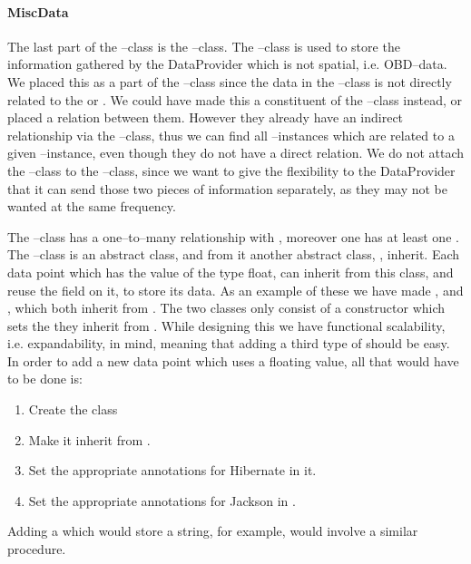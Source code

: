 \paragraph*{MiscData}
The last part of the --class is the --class. 
The --class is used to store the information gathered by the DataProvider which is not spatial, i.e. \ac{OBD}--data.
We placed this as a part of the --class since the data in the --class is not directly related to the  or . 
We could have made this a constituent of the --class instead, or placed a relation between them.
However they already have an indirect relationship via the --class, 
thus we can find all --instances which are related to a given --instance, even though they do not have a direct relation. 
We do not attach the --class to the --class, 
since we want to give the flexibility to the DataProvider that it can send those two pieces of information separately, as they may not be wanted at the same frequency. 

The --class has a one--to--many relationship with , moreover one  has at least one . 
The --class is an abstract class, and from it another abstract class, , inherit. 
Each data point which has the value of the type float, can inherit from this class, and reuse the  field on it, to store its data.
As an example of these we have made , and , which both inherit from . 
The two classes only consist of a constructor which sets the  they inherit from .
While designing this we have functional scalability, i.e. expandability, in mind, meaning that adding a third type of  should be easy. 
In order to add a new data point which uses a floating value, all that would have to be done is: 
\begin{enumerate}
    \item Create the class 
    \item Make it inherit from .
    \item Set the appropriate annotations for Hibernate in it.
    \item Set the appropriate annotations for Jackson in .
\end{enumerate}

Adding a  which would store a string, for example, would involve a similar procedure.
